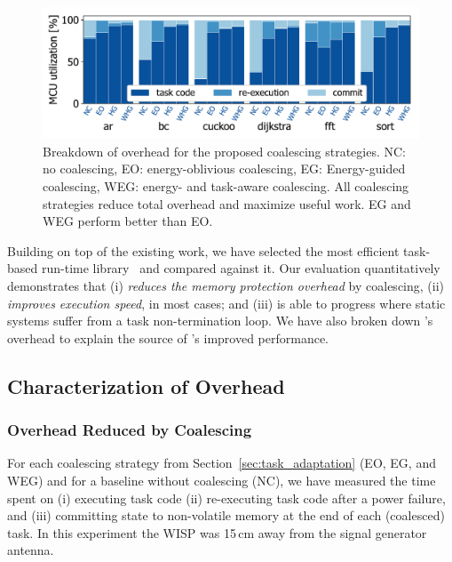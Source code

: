 \begin{figure}
	\centering
	\includegraphics[width=\columnwidth]{figures/coalEfficiency}
    \caption{Breakdown of overhead for the proposed coalescing strategies.
NC: no coalescing, EO: energy-oblivious coalescing, EG: Energy-guided coalescing, WEG:
energy- and task-aware coalescing. All coalescing strategies reduce total
overhead and maximize useful work. EG and WEG perform better than EO.}
	\label{fig:overallOverheadBreakdown}
\end{figure}
%
Building on top of the existing work, we have selected the most efficient task-based run-time library~\cite{alpaca} and compared \sys against it.
Our evaluation quantitatively demonstrates that \sys (i) \emph{reduces the memory
protection overhead} by coalescing, (ii) \emph{improves execution speed}, in most cases; %
and (iii) \sys is able to progress where static systems suffer from a task non-termination loop. 
We have also broken down \sys's overhead to explain the source of \sys's improved performance.
%
\subsection{Characterization of Overhead}
\label{sec:coala_overhead}

\subsubsection{Overhead Reduced by Coalescing}
\label{sec:overhead-coalescing}

For each coalescing strategy from Section~\ref{sec:task_adaptation} (EO, EG,
and WEG) and for a baseline without coalescing (NC), we have measured the time
spent on (i) executing task code (ii) re-executing task code after a power failure, and
(iii) committing state to non-volatile memory at the end of each (coalesced)
task.  In this experiment the WISP was 15\,cm away from the signal generator
antenna.

